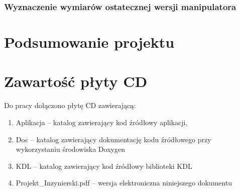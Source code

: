 \documentclass[printmode]{mgr}
\begin{document}
\subsection{Wyznaczenie wymiarów ostatecznej wersji manipulatora}

\chapter{Podsumowanie projektu}



\appendix
\chapter{Zawartość płyty CD}
Do pracy dołączono płytę CD zawierającą:
\begin{enumerate}
\item Aplikacja -- katalog zawierający kod źródłowy aplikacji,
\item Doc -- katalog zawierający dokumentację kodu źródłowego przy wykorzystaniu środowiska Doxygen
\item KDL -- katalog zawierający kod źródłowy biblioteki KDL \cite{KDL}
\item Projekt\_Inzynierski.pdf -- wersja elektroniczna niniejszego dokumentu
\end{enumerate}





\end{document}
